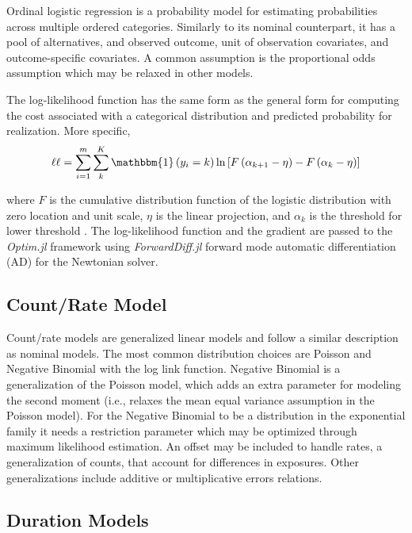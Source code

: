 \documentclass{juliacon}
\begin{document}
Ordinal logistic regression is a probability model for estimating probabilities across multiple ordered categories. Similarly to its nominal counterpart, it has a pool of alternatives, and observed outcome, unit of observation covariates, and outcome-specific covariates. A common assumption is the proportional odds assumption which may be relaxed in other models.

The log-likelihood function has the same form as the general form for computing the cost associated with a categorical distribution and predicted probability for realization. More specific,
\begin{equation}
	\ell \ell = \sum_{i = 1}^{m} \sum_{k}^{K} \mathbbm{1}\left(y_{i} = k\right) \ln\left[F\left(\alpha_{k + 1} - \eta\right) - F\left(\alpha_{k} - \eta\right)\right]
\end{equation}

where $F$ is the cumulative distribution function of the logistic distribution with zero location and unit scale, $\eta$ is the linear projection, and $\alpha_{k}$ is the threshold for lower threshold \cite{ologit}. The log-likelihood function and the gradient are passed to the \textit{Optim.jl} framework \cite{Optim} using \textit{ForwardDiff.jl} \cite{ForwardDiff} forward mode automatic differentiation (AD) for the Newtonian solver.

\subsection{Count/Rate Model}

Count/rate models are generalized linear models and follow a similar description as nominal models. The most common distribution choices are Poisson and Negative Binomial with the log link function. Negative Binomial is a generalization of the Poisson model, which adds an extra parameter for modeling the second moment (i.e., relaxes the mean equal variance assumption in the Poisson model). For the Negative Binomial to be a distribution in the exponential family it needs a restriction parameter which may be optimized through maximum likelihood estimation. An offset may be included to handle rates, a generalization of counts, that account for differences in exposures. Other generalizations include additive or multiplicative errors relations.

\subsection{Duration Models}
\end{document}
